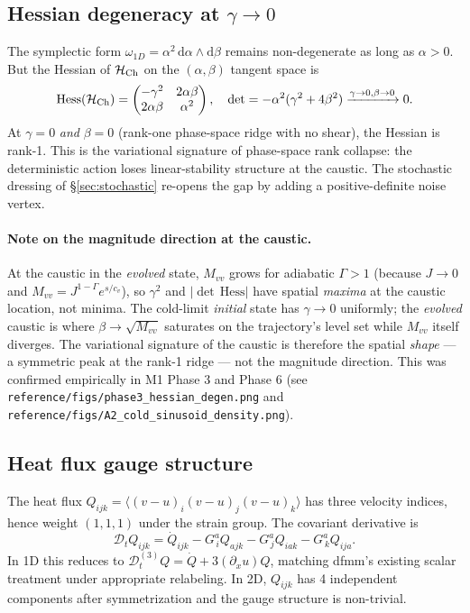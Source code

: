 \documentclass[11pt]{article}
\newcommand{\dd}{\mathrm{d}}
\begin{document}
\subsection{Hessian degeneracy at $\gamma\to 0$}
\label{sec:hessian}

The symplectic form $\omega_{1D} = \alpha^2\,\dd\alpha\wedge\dd\beta$
remains non-degenerate as long as $\alpha > 0$. But the Hessian of
$\mathcal{H}_{\rm Ch}$ on the $(\alpha,\beta)$ tangent space is
\begin{equation}
  \mathrm{Hess}(\mathcal{H}_{\rm Ch}) = \begin{pmatrix} -\gamma^2 & 2\alpha\beta \\ 2\alpha\beta & \alpha^2\end{pmatrix},
  \quad\det = -\alpha^2(\gamma^2 + 4\beta^2)
  \xrightarrow{\gamma\to 0,\beta\to 0} 0.
  \label{eq:hessian}
\end{equation}
At $\gamma=0$ \emph{and} $\beta=0$ (rank-one phase-space ridge with
no shear), the Hessian is rank-1. This is the variational signature
of phase-space rank collapse: the deterministic action loses
linear-stability structure at the caustic. The stochastic dressing of
\S\ref{sec:stochastic} re-opens the gap by adding a positive-definite
noise vertex.

\paragraph{Note on the magnitude direction at the caustic.} At the
caustic in the \emph{evolved} state, $M_{vv}$ grows for adiabatic
$\Gamma > 1$ (because $J\to 0$ and $M_{vv} = J^{1-\Gamma}e^{s/c_v}$),
so $\gamma^2$ and $|\det\,\mathrm{Hess}|$ have spatial \emph{maxima}
at the caustic location, not minima. The cold-limit \emph{initial}
state has $\gamma\to 0$ uniformly; the \emph{evolved} caustic is
where $\beta\to\sqrt{M_{vv}}$ saturates on the trajectory's level set
while $M_{vv}$ itself diverges. The variational signature of the
caustic is therefore the spatial \emph{shape} --- a symmetric peak
at the rank-1 ridge --- not the magnitude direction. This was
confirmed empirically in M1 Phase 3 and Phase 6 (see
\verb|reference/figs/phase3_hessian_degen.png| and
\verb|reference/figs/A2_cold_sinusoid_density.png|).

\subsection{Heat flux gauge structure}

The heat flux $Q_{ijk} = \langle (v-u)_i(v-u)_j(v-u)_k\rangle$ has
three velocity indices, hence weight $(1,1,1)$ under the strain
group. The covariant derivative is
\begin{equation}
  \mathcal{D}_t Q_{ijk} = \dot Q_{ijk} - G^a_{\,i}Q_{ajk} - G^a_{\,j}Q_{iak} - G^a_{\,k}Q_{ija}.
\end{equation}
In 1D this reduces to $\mathcal{D}_t^{(3)}Q = \dot Q + 3(\partial_x u)Q$,
matching dfmm's existing scalar treatment under appropriate
relabeling. In 2D, $Q_{ijk}$ has 4 independent components after
symmetrization and the gauge structure is non-trivial.
\end{document}

